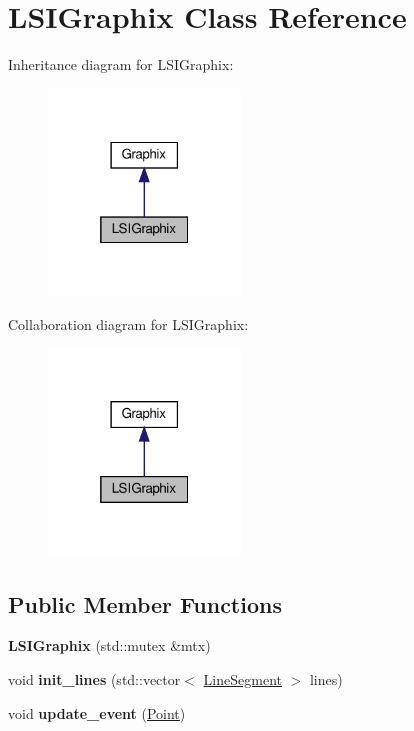 \hypertarget{classLSIGraphix}{}\section{L\+S\+I\+Graphix Class Reference}
\label{classLSIGraphix}


Inheritance diagram for L\+S\+I\+Graphix\+:
\nopagebreak
\begin{figure}[H]
\begin{center}
\leavevmode
\includegraphics[width=145pt]{classLSIGraphix__inherit__graph}
\end{center}
\end{figure}


Collaboration diagram for L\+S\+I\+Graphix\+:
\nopagebreak
\begin{figure}[H]
\begin{center}
\leavevmode
\includegraphics[width=145pt]{classLSIGraphix__coll__graph}
\end{center}
\end{figure}
\subsection*{Public Member Functions}
\begin{DoxyCompactItemize}
\item 
\mbox{\label{classLSIGraphix_a36adc59a5f2f87571cb230de95e0c0bc}} 
{\bfseries L\+S\+I\+Graphix} (std\+::mutex \&mtx)
\item 
\mbox{\label{classLSIGraphix_aa95fa264bddca976f974f6eae9173444}} 
void {\bfseries init\+\_\+lines} (std\+::vector$<$ \hyperlink{classLineSegment}{Line\+Segment} $>$ lines)
\item 
\mbox{\label{classLSIGraphix_a136dca7736d6a885ef9b40824808c447}} 
void {\bfseries update\+\_\+event} (\hyperlink{classPoint}{Point})
\end{DoxyCompactItemize}
